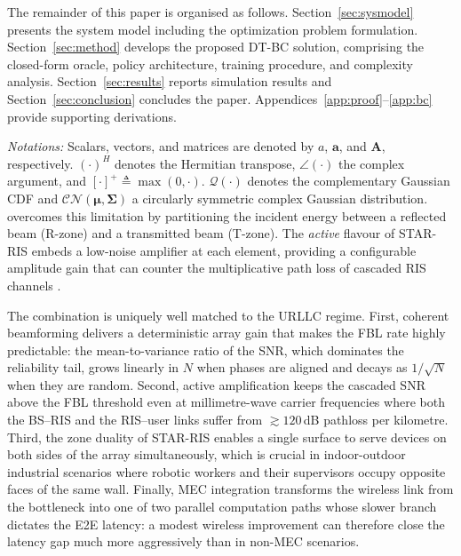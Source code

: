 \documentclass[journal]{IEEEtran}
\begin{document}
The remainder of this paper is organised as follows.
Section~\ref{sec:sysmodel} presents the system model including the
optimization problem formulation. Section~\ref{sec:method} develops
the proposed DT-BC solution, comprising the closed-form oracle,
policy architecture, training procedure, and complexity analysis.
Section~\ref{sec:results} reports simulation results and
Section~\ref{sec:conclusion} concludes the paper.
Appendices~\ref{app:proof}--\ref{app:bc} provide supporting
derivations.

\textit{Notations:} Scalars, vectors, and matrices are denoted by
$a$, $\mathbf{a}$, and $\mathbf{A}$, respectively. $(\cdot)^H$
denotes the Hermitian transpose, $\angle(\cdot)$ the complex argument,
and $[\cdot]^+\!\triangleq\!\max(0,\cdot)$. $\mathcal{Q}(\cdot)$
denotes the complementary Gaussian CDF and
$\mathcal{CN}(\boldsymbol{\mu},\boldsymbol{\Sigma})$ a circularly
symmetric complex Gaussian distribution.
\cite{liu2021star,xu2021star,mu2022star} overcomes this limitation by
partitioning the incident energy between a reflected beam (R-zone)
and a transmitted beam (T-zone). The \emph{active} flavour of
STAR-RIS embeds a low-noise amplifier at each element, providing a
configurable amplitude gain that can counter the multiplicative path
loss of cascaded RIS channels
\cite{long2021active,zhang2023activevspassive,zhi2022activeris}.

The combination is uniquely well matched to the URLLC regime. First,
coherent beamforming delivers a deterministic array gain that makes
the FBL rate highly predictable: the mean-to-variance ratio of the
SNR, which dominates the reliability tail, grows linearly in $N$ when
phases are aligned and decays as $1/\sqrt{N}$ when they are random.
Second, active amplification keeps the cascaded SNR above the FBL
threshold even at millimetre-wave carrier frequencies where both the
BS--RIS and the RIS--user links suffer from $\!\gtrsim\!120\,$dB
pathloss per kilometre. Third, the zone duality of STAR-RIS enables a
single surface to serve devices on both sides of the array
simultaneously, which is crucial in indoor-outdoor industrial
scenarios where robotic workers and their supervisors occupy opposite
faces of the same wall. Finally, MEC integration transforms the
wireless link from the bottleneck into one of two parallel
computation paths whose slower branch dictates the E2E latency: a
modest wireless improvement can therefore close the latency gap much
more aggressively than in non-MEC scenarios.


\end{document}
